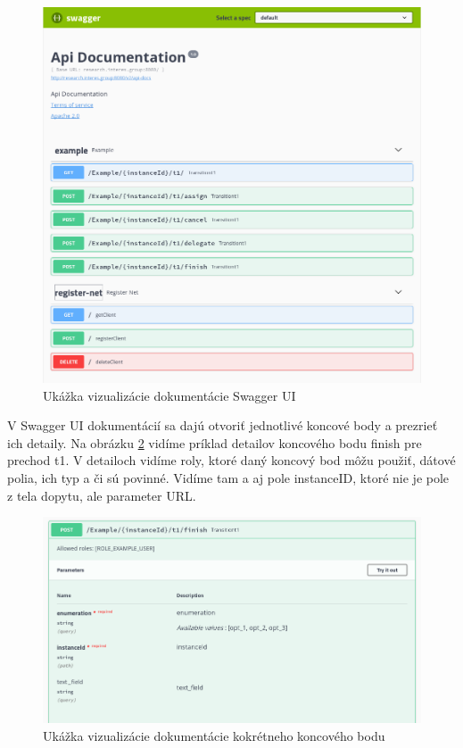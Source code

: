 \begin{figure}[!htbp]
	\centering
	\includegraphics[width=16cm]{img/swagger_ui.png}
	\caption{Ukážka vizualizácie dokumentácie Swagger UI}
	\label{swagger_ui}
\end{figure}

V Swagger UI dokumentácií sa dajú otvoriť jednotlivé koncové body a prezrieť ich detaily. Na obrázku \ref{swagger_ui_endpoint} vidíme príklad detailov koncového bodu finish pre prechod t1. V detailoch vidíme roly, ktoré daný koncový bod môžu použiť, dátové polia, ich typ a či sú povinné. Vidíme tam a aj pole instanceID, ktoré nie je pole z tela dopytu, ale parameter URL.

\begin{figure}[!htbp]
	\centering
	\includegraphics[width=16cm]{img/swagger_ui_endpoint.png}
	\caption{Ukážka vizualizácie dokumentácie kokrétneho koncového bodu}
	\label{swagger_ui_endpoint}
\end{figure}




